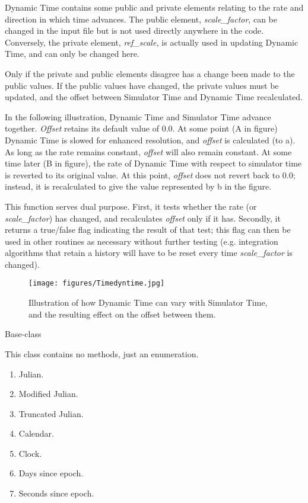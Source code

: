 {\begin{enumerate}
{\begin{enumerate}
Dynamic Time contains some public and private elements relating to the rate
and direction in which time advances.  The public element,
\textit{scale\_factor}, can be changed in the input file but is not
used directly anywhere in the code.  Conversely, the private
element,\textit{ ref\_scale,} is actually used in updating Dynamic Time, and
can only be changed here.

Only if the private and public elements disagree has a change been made
to the public values.  If the public values have changed, the private
values must be updated, and the offset between Simulator Time and Dynamic Time
recalculated.

In the following illustration, Dynamic Time and Simulator Time advance
together.  \textit{Offset} retains its default value of 0.0.  At some
point (A in figure) Dynamic Time is slowed for enhanced resolution, and
\textit{offset} is calculated (to a).  As long as the rate remains
constant, \textit{offset} will also remain constant.  At some time
later (B in figure), the rate of Dynamic Time with respect to simulator
time is reverted to its original value.  At this point, \textit{offset} does
not revert back to 0.0; instead, it is recalculated to give the value
represented by b in the figure.

This function serves dual purpose.  First, it tests whether the rate (or
\textit{scale\_factor}) has changed, and recalculates \textit{offset}
only if it has.  Secondly, it returns a true/false flag indicating the
result of that test; this flag can then be used in other routines as
necessary without further testing (e.g. integration algorithms that
retain a history will have to be reset every time
\textit{scale\_factor} is changed).

\begin{figure}[htp]
\begin{center}
\texttt{[image: figures/Timedyntime.jpg]}
\caption{Illustration of how Dynamic Time can vary with Simulator Time,
and the resulting effect on the offset between them.}
\end{center}
\end{figure}

\end{enumerate}}


 Base-class

This class contains no methods, just an enumeration.

\begin{enumerate}
\item Julian.
\item Modified Julian.
\item Truncated Julian.
\item Calendar.
\item Clock.
\item Days since epoch.
\item Seconds since epoch.
\end{enumerate}




\end{enumerate}}

